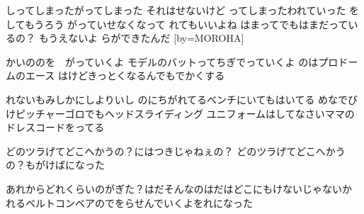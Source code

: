 \documentclass{article}
\newenvironment{Japanese}{%
\CJKfamily{min}%
\CJKtilde
\CJKnospace}{}
\begin{document}
\begin{CJK}{UTF8}{}
\begin{Japanese}
\begin{songs}{}
しってしまったがってしまった
それはせないけど
ってしまったわれていった
をしてもうろう
がっていせなくなって
れてもいいよね
はまってでもはまだっているの？
もうえないよ
らができたんだ
\endverse
\endsong
[by=MOROHA]
\beginverse

かいののを　がっていくよ
モデルのバットってちぎでっていくよ
のはプロドームのエース
はけどきっとくなるんでもでかくする

れないもみしかにしよりいし
のにちがれてるベンチにいてもはいてる
めなでびけピッチャーゴロでもヘッドスライディング
ユニフォームはしてなさいママのドレスコードをってる

どのツラげてどこへかうの？にはつきじゃねぇの？
どのツラげてどこへかうの？もがけばになった

あれからどれくらいのがぎた？はだそんなのはだはどこにもけないじゃないか
れるベルトコンベアのでをらせんでいくよをれになった


\end{songs}
\end{Japanese}
\end{CJK}
\end{document}
